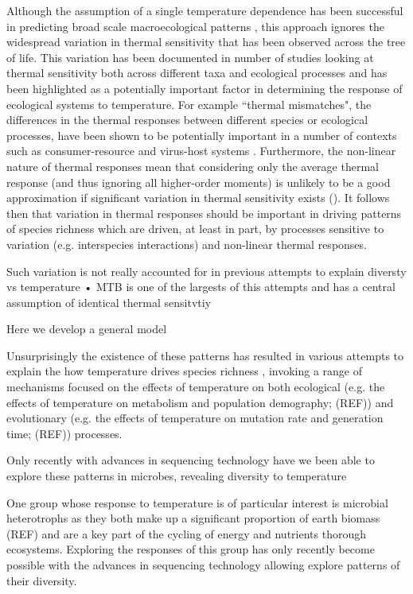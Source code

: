 \documentclass{article}
\begin{document}
Although the assumption of a single temperature dependence has been successful in predicting broad scale macroecological patterns \citep{Gillooly2001,Brown2004}, this approach ignores the widespread variation in thermal sensitivity that has been observed across the tree of life. This variation has been documented in number of studies looking at thermal sensitivity both across different taxa and ecological processes \citep{Dell2011} and has been highlighted as a potentially important factor in determining the response of ecological systems to temperature. For example ``thermal mismatches", the differences in the thermal responses between different species or ecological processes, have been shown to be potentially important in a number of contexts such as consumer-resource \citep{Dell2014} and virus-host systems \citep{Demory2021}. Furthermore, the non-linear nature of thermal responses mean that considering only the average thermal response (and thus ignoring all higher-order moments) is unlikely to be a good approximation if significant variation in thermal sensitivity exists (\citet{Savage2004}). It follows then that variation in thermal responses should be important in driving patterns of species richness which are driven, at least in part, by processes sensitive to variation (e.g. interspecies interactions) and non-linear thermal responses.

Such variation is not really accounted for in previous attempts to explain diversty vs temperature
• MTB is one of the largests of this attempts and has a central assumption of identical thermal sensitvtiy

Here we develop a general model






Unsurprisingly the existence of these patterns has resulted in various attempts to explain the how temperature drives species richness \citep{Rohde1992}, invoking a range of mechanisms focused on the effects of temperature on both ecological (e.g. the effects of temperature on metabolism and population demography; (REF)) and evolutionary (e.g. the effects of temperature on mutation rate and generation time; (REF)) processes.

Only recently with advances in sequencing technology have we been able to explore these patterns in microbes, revealing  diversity to temperature 

One group whose response to temperature is of particular interest is microbial heterotrophs as they both make up a significant proportion of earth biomass (REF) and are a key part of the cycling of energy and nutrients thorough ecosystems. Exploring the responses of this group has only recently become possible with the advances in sequencing technology allowing explore patterns of their diversity. 
\end{document}
